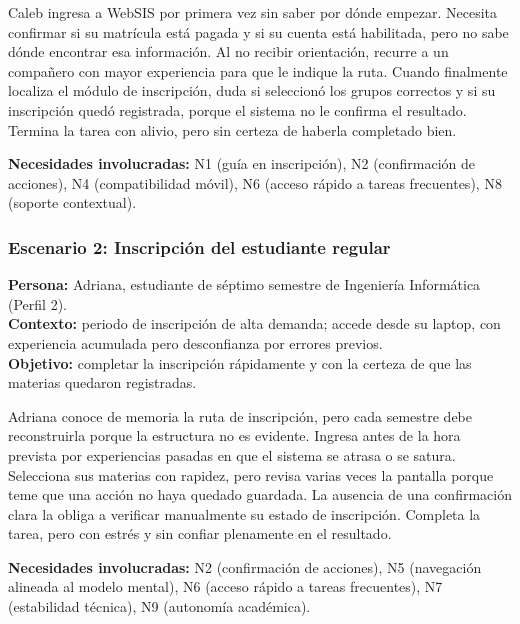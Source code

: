 Caleb ingresa a WebSIS por primera vez sin saber por dónde empezar. Necesita confirmar si su matrícula está pagada y si su cuenta está habilitada, pero no sabe dónde encontrar esa información. Al no recibir orientación, recurre a un compañero con mayor experiencia para que le indique la ruta. Cuando finalmente localiza el módulo de inscripción, duda si seleccionó los grupos correctos y si su inscripción quedó registrada, porque el sistema no le confirma el resultado. Termina la tarea con alivio, pero sin certeza de haberla completado bien.

\noindent\textbf{Necesidades involucradas:} N1 (guía en inscripción), N2 (confirmación de acciones), N4 (compatibilidad móvil), N6 (acceso rápido a tareas frecuentes), N8 (soporte contextual).

\subsubsection*{Escenario 2: Inscripción del estudiante regular}

\textbf{Persona:} Adriana, estudiante de séptimo semestre de Ingeniería Informática (Perfil 2). \\
\textbf{Contexto:} periodo de inscripción de alta demanda; accede desde su laptop, con experiencia acumulada pero desconfianza por errores previos. \\
\textbf{Objetivo:} completar la inscripción rápidamente y con la certeza de que las materias quedaron registradas.

Adriana conoce de memoria la ruta de inscripción, pero cada semestre debe reconstruirla porque la estructura no es evidente. Ingresa antes de la hora prevista por experiencias pasadas en que el sistema se atrasa o se satura. Selecciona sus materias con rapidez, pero revisa varias veces la pantalla porque teme que una acción no haya quedado guardada. La ausencia de una confirmación clara la obliga a verificar manualmente su estado de inscripción. Completa la tarea, pero con estrés y sin confiar plenamente en el resultado.

\noindent\textbf{Necesidades involucradas:} N2 (confirmación de acciones), N5 (navegación alineada al modelo mental), N6 (acceso rápido a tareas frecuentes), N7 (estabilidad técnica), N9 (autonomía académica).

